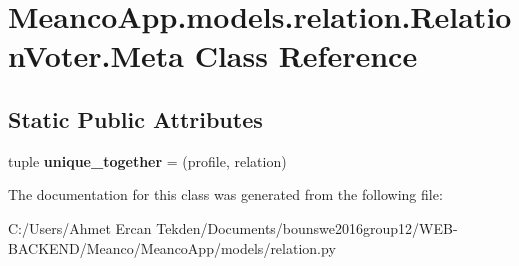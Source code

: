 \hypertarget{class_meanco_app_1_1models_1_1relation_1_1_relation_voter_1_1_meta}{}\section{Meanco\+App.\+models.\+relation.\+Relation\+Voter.\+Meta Class Reference}
\label{class_meanco_app_1_1models_1_1relation_1_1_relation_voter_1_1_meta}
\subsection*{Static Public Attributes}
\begin{DoxyCompactItemize}
\item 
\hypertarget{class_meanco_app_1_1models_1_1relation_1_1_relation_voter_1_1_meta_ab5969e62a2874284da7214d397cedb0c}{}\label{class_meanco_app_1_1models_1_1relation_1_1_relation_voter_1_1_meta_ab5969e62a2874284da7214d397cedb0c} 
tuple {\bfseries unique\+\_\+together} = (\textquotesingle{}profile\textquotesingle{}, \textquotesingle{}relation\textquotesingle{})
\end{DoxyCompactItemize}


The documentation for this class was generated from the following file\+:\begin{DoxyCompactItemize}
\item 
C\+:/\+Users/\+Ahmet Ercan Tekden/\+Documents/bounswe2016group12/\+W\+E\+B-\/\+B\+A\+C\+K\+E\+N\+D/\+Meanco/\+Meanco\+App/models/relation.\+py\end{DoxyCompactItemize}
